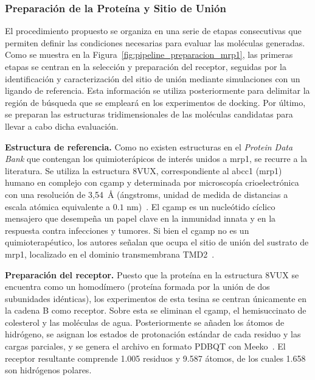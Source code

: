 \subsubsection{Preparación de la Proteína y Sitio de Unión}
\label{subsec:prep_proteina}

El procedimiento propuesto se organiza en una serie de etapas consecutivas que permiten definir las condiciones necesarias para evaluar las moléculas generadas. Como se muestra en la Figura~\ref{fig:pipeline_preparacion_mrp1}, las primeras etapas se centran en la selección y preparación del receptor, seguidas por la identificación y caracterización del sitio de unión mediante simulaciones con un ligando de referencia. Esta información se utiliza posteriormente para delimitar la región de búsqueda que se empleará en los experimentos de docking. Por último, se preparan las estructuras tridimensionales de las moléculas candidatas para llevar a cabo dicha evaluación.



\textbf{Estructura de referencia.} Como no existen estructuras en el \textit{Protein Data Bank} que contengan los quimioterápicos de interés unidos a \gls{mrp1}, se recurre a la literatura. Se utiliza la estructura 8VUX, correspondiente al \gls{abcc1} (\gls{mrp1}) humano en complejo con \gls{cgamp} y determinada por microscopía crioelectrónica con una resolución de 3,54~Å (ángstroms, unidad de medida de distancias a escala atómica equivalente a $0.1\text{ nm}$)~\cite{shinde2025structures}. El \gls{cgamp} es un nucleótido cíclico mensajero que desempeña un papel clave en la inmunidad innata y en la respuesta contra infecciones y tumores. Si bien el \gls{cgamp} no es un quimioterapéutico, los autores señalan que ocupa el sitio de unión del sustrato de \gls{mrp1}, localizado en el dominio transmembrana TMD2~\cite{shinde2025structures}.

\textbf{Preparación del receptor.} Puesto que la proteína en la estructura 8VUX se encuentra como un homodímero (proteína formada por la unión de dos subunidades idénticas), los experimentos de esta tesina se centran únicamente en la cadena B como receptor. Sobre esta se eliminan el \gls{cgamp}, el hemisuccinato de colesterol y las moléculas de agua. Posteriormente se añaden los átomos de hidrógeno, se asignan los estados de protonación estándar de cada residuo y las cargas parciales, y se genera el archivo en formato PDBQT con Meeko~\cite{santosmartins2025meeko}. El receptor resultante comprende 1.005 residuos y 9.587 átomos, de los cuales 1.658 son hidrógenos polares.

